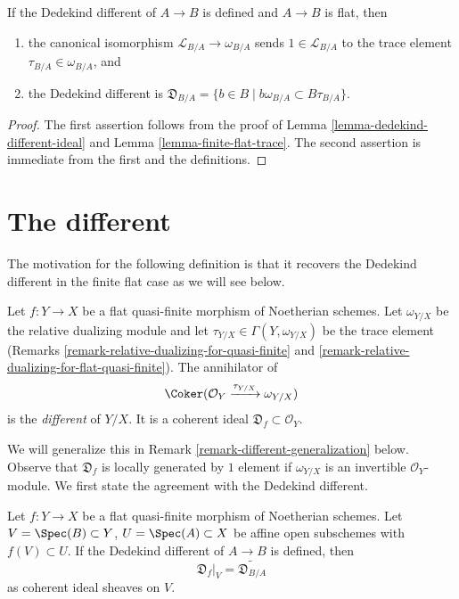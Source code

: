 \begin{lemma}
\label{lemma-flat-dedekind-complementary-module-trace}
If the Dedekind different of $A \to B$ is defined and $A \to B$ is flat, then
\begin{enumerate}
\item the canonical isomorphism $\mathcal{L}_{B/A} \to \omega_{B/A}$
sends $1 \in \mathcal{L}_{B/A}$ to the trace element
$\tau_{B/A} \in \omega_{B/A}$, and
\item the Dedekind different is
$\mathfrak{D}_{B/A} = \{b \in B \mid b\omega_{B/A} \subset B\tau_{B/A}\}$.
\end{enumerate}
\end{lemma}

\begin{proof}
The first assertion
follows from the proof of Lemma \ref{lemma-dedekind-different-ideal}
and Lemma \ref{lemma-finite-flat-trace}.
The second assertion is immediate from the first and the
definitions.
\end{proof}



\section{The different}
\label{section-different}

\noindent
The motivation for the following definition is that it recovers the
Dedekind different in the finite flat case as we will see below.

\begin{definition}
\label{definition-different}
Let $f : Y \to X$ be a flat quasi-finite morphism of Noetherian schemes.
Let $\omega_{Y/X}$ be the relative dualizing module and let
$\tau_{Y/X} \in \Gamma(Y, \omega_{Y/X})$ be the trace element
(Remarks \ref{remark-relative-dualizing-for-quasi-finite} and
\ref{remark-relative-dualizing-for-flat-quasi-finite}).
The annihilator of
$$
\Coker(\mathcal{O}_Y \xrightarrow{\tau_{Y/X}} \omega_{Y/X})
$$
is the {\it different} of $Y/X$. It is a coherent ideal
$\mathfrak{D}_f \subset \mathcal{O}_Y$.
\end{definition}

\noindent
We will generalize this in Remark \ref{remark-different-generalization} below.
Observe that $\mathfrak{D}_f$ is locally generated by $1$ element if
$\omega_{Y/X}$ is an invertible $\mathcal{O}_Y$-module.
We first state the agreement with the Dedekind different.

\begin{lemma}
\label{lemma-flat-agree-dedekind}
Let $f : Y \to X$ be a flat quasi-finite morphism of Noetherian schemes.
Let $V = \Spec(B) \subset Y$, $U = \Spec(A) \subset X$
be affine open subschemes with $f(V) \subset U$.
If the Dedekind different of $A \to B$ is defined, then
$$
\mathfrak{D}_f|_V = \widetilde{\mathfrak{D}_{B/A}}
$$
as coherent ideal sheaves on $V$.
\end{lemma}

